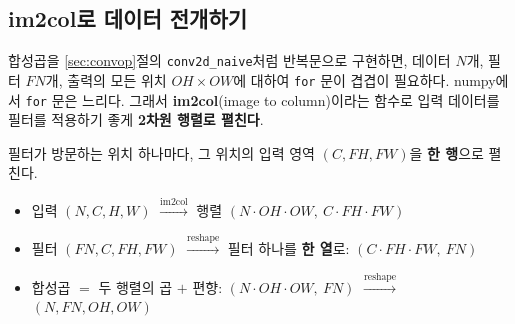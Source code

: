 \documentclass[11pt,a4paper]{article}
\begin{document}
\subsection{im2col로 데이터 전개하기}\label{sec:im2col}

합성곱을 \ref{sec:convop}절의 \texttt{conv2d\_naive}처럼 반복문으로 구현하면,
데이터 $N$개, 필터 $FN$개, 출력의 모든 위치 $OH\times OW$에 대하여 \texttt{for} 문이 겹겹이 필요하다.
numpy에서 \texttt{for} 문은 느리다. 그래서 \textbf{im2col}(image to column)이라는 함수로
입력 데이터를 필터를 적용하기 좋게 \textbf{2차원 행렬로 펼친다}.

\begin{keybox}
필터가 방문하는 위치 하나마다, 그 위치의 입력 영역 $(C,FH,FW)$을 \textbf{한 행}으로 펼친다.
\begin{itemize}[leftmargin=1.5em]
\item 입력 $(N,C,H,W)$ $\xrightarrow{\text{im2col}}$ 행렬 $(N\cdot OH\cdot OW,\ C\cdot FH\cdot FW)$
\item 필터 $(FN,C,FH,FW)$ $\xrightarrow{\text{reshape}}$ 필터 하나를 \textbf{한 열}로: $(C\cdot FH\cdot FW,\ FN)$
\item 합성곱 $=$ 두 행렬의 곱 $+$ 편향: $(N\cdot OH\cdot OW,\ FN)$ $\xrightarrow{\text{reshape}}$ $(N,FN,OH,OW)$
\end{itemize}
\end{keybox}
\end{document}
